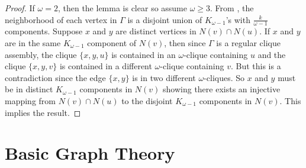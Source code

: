 \documentclass[12pt]{report}
\theoremstyle{definition}
\begin{document}
\begin{proof}
    If $\omega=2$, then the lemma is clear so assume $\omega \geq 3$. From \cite[Proposition 1]{guest}, the neighborhood of each vertex in $\Gamma$ is a disjoint union of $K_{\omega -1}$'s with $\frac{k}{\omega -1}$ components. Suppose $x$ and $y$ are distinct vertices in $N(v)\cap N(u)$. If $x$ and $y$ are in the same $K_{\omega -1}$ component of $N(v)$, then since $\Gamma$ is a regular clique assembly, the clique $\{x,y,u\}$ is contained in an $\omega$-clique containing $u$ and the clique $\{x,y,v\}$ is contained in a different $\omega$-clique containing $v$. But this is a contradiction since the edge $\{x,y\}$ is in two different $\omega$-cliques. So $x$ and $y$ must be in distinct $K_{\omega-1}$ components in $N(v)$ showing there exists an injective mapping from $N(v)\cap N(u)$ to the disjoint $K_{\omega-1}$ components in $N(v)$. This implies the result.
\end{proof}
\chapter{Basic Graph Theory}
\end{document}
